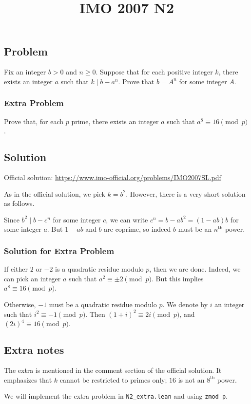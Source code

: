 \documentclass{article}
\title{IMO 2007 N2}
\author{}
\date{}
\begin{document}
\maketitle



\subsection*{Problem}

Fix an integer $b > 0$ and $n \geq 0$.
Suppose that for each positive integer $k$, there exists an integer $a$ such that $k \mid b - a^n$.
Prove that $b = A^n$ for some integer $A$.


\subsubsection*{Extra Problem}

Prove that, for each $p$ prime, there exists an integer $a$ such that $a^8 \equiv 16 \pmod{p}$.




\subsection*{Solution}

Official solution: \url{https://www.imo-official.org/problems/IMO2007SL.pdf}

As in the official solution, we pick $k = b^2$.
However, there is a very short solution as follows.

Since $b^2 \mid b - c^n$ for some integer $c$, we can write $c^n = b - ab^2 = (1 - ab) b$ for some integer $a$.
But $1 - ab$ and $b$ are coprime, so indeed $b$ must be an $n^{\text{th}}$ power.


\subsubsection*{Solution for Extra Problem}

If either $2$ or $-2$ is a quadratic residue modulo $p$, then we are done.
Indeed, we can pick an integer $a$ such that $a^2 \equiv \pm 2 \pmod{p}$.
But this implies $a^8 \equiv 16 \pmod{p}$.

Otherwise, $-1$ must be a quadratic residue modulo $p$.
We denote by $i$ an integer such that $i^2 \equiv -1 \pmod{p}$.
Then $(1 + i)^2 \equiv 2i \pmod{p}$, and $(2i)^4 \equiv 16 \pmod{p}$.



\subsection*{Extra notes}

The extra is mentioned in the comment section of the official solution.
It emphasizes that $k$ cannot be restricted to primes only; $16$ is not an $8^{\text{th}}$ power.

We will implement the extra problem in \texttt{N2\_extra.lean} and using \texttt{zmod p}.
\end{document}

